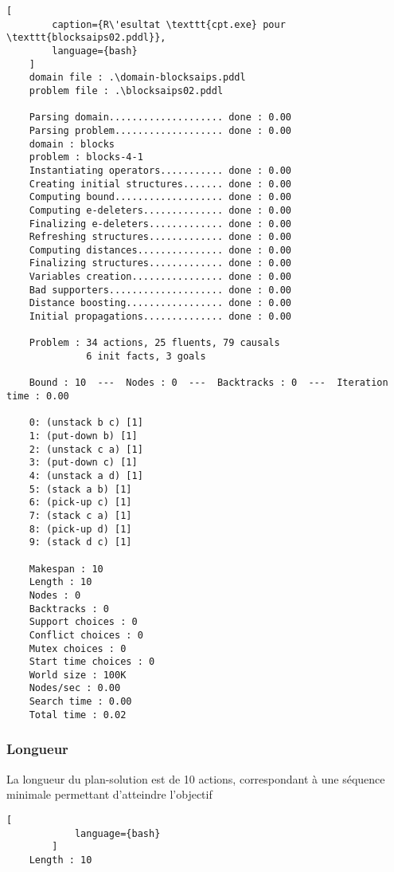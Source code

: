 \documentclass[../CSC_5RO16_TA_TP5.tex]{subfiles}
\begin{document}
\begin{scriptsize}\mycode
    \begin{lstlisting}[
        caption={R\'esultat \texttt{cpt.exe} pour \texttt{blocksaips02.pddl}},
        language={bash}
    ]
    domain file : .\domain-blocksaips.pddl
    problem file : .\blocksaips02.pddl
    
    Parsing domain.................... done : 0.00
    Parsing problem................... done : 0.00
    domain : blocks
    problem : blocks-4-1
    Instantiating operators........... done : 0.00
    Creating initial structures....... done : 0.00
    Computing bound................... done : 0.00
    Computing e-deleters.............. done : 0.00
    Finalizing e-deleters............. done : 0.00
    Refreshing structures............. done : 0.00
    Computing distances............... done : 0.00
    Finalizing structures............. done : 0.00
    Variables creation................ done : 0.00
    Bad supporters.................... done : 0.00
    Distance boosting................. done : 0.00
    Initial propagations.............. done : 0.00
    
    Problem : 34 actions, 25 fluents, 79 causals
              6 init facts, 3 goals
    
    Bound : 10  ---  Nodes : 0  ---  Backtracks : 0  ---  Iteration time : 0.00
    
    0: (unstack b c) [1]
    1: (put-down b) [1]
    2: (unstack c a) [1]
    3: (put-down c) [1]
    4: (unstack a d) [1]
    5: (stack a b) [1]
    6: (pick-up c) [1]
    7: (stack c a) [1]
    8: (pick-up d) [1]
    9: (stack d c) [1]
    
    Makespan : 10
    Length : 10
    Nodes : 0
    Backtracks : 0
    Support choices : 0
    Conflict choices : 0
    Mutex choices : 0
    Start time choices : 0
    World size : 100K
    Nodes/sec : 0.00
    Search time : 0.00
    Total time : 0.02
    \end{lstlisting}
\end{scriptsize}

\subsubsection{Longueur}
\begin{resolution}
    La longueur du plan-solution est de 10 actions, correspondant à une séquence minimale permettant d'atteindre l'objectif

    \begin{scriptsize}\mycode
        \begin{lstlisting}[
            language={bash}
        ]
    Length : 10
        \end{lstlisting}
    \end{scriptsize}
\end{resolution}
\end{document}
